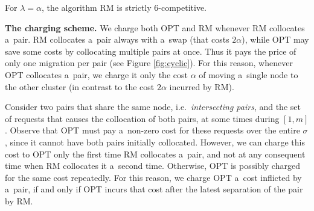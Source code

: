 \documentclass[a4paper,anonymous,USenglish]{lipics-v2019}
\newcommand{\OPT}{\textsc{OPT}\xspace}
\newcommand{\RM}{\textsc{RM}\xspace} %
\begin{document}
\begin{theorem} \label{thm:k=2}
	For $\lambda=\alpha$, the algorithm \RM  is strictly 6-competitive.
\end{theorem}

\noindent
\textbf{The charging scheme.}
We charge both \OPT and \RM whenever \RM collocates a~pair.%
\RM collocates a~pair always with a~swap %
(that costs $2\alpha$),
while \OPT may save some costs by collocating multiple pairs at once.
 Thus it pays the price of only one migration per pair  (see Figure \ref{fig:cyclic}).
For this reason, whenever \OPT collocates a~pair,
we charge it only the cost $\alpha$ of moving a~single node to the other cluster (in contrast to the cost $2\alpha$ incurred by \RM).

Consider two  pairs that share the same node, 
i.e.~\emph{intersecting pairs},
and the set of requests that causes the collocation of both pairs,
at some  times during  $[1,m]$.
Observe that \OPT must pay a~non-zero cost
for these requests over the entire $\sigma$,
since it cannot have both pairs initially collocated.
However,
we can charge this cost to \OPT only the first time \RM collocates a~pair,
and not at any consequent time when \RM collocates it a~second time.
Otherwise,
 \OPT is possibly charged for the same cost repeatedly.
For this reason,
we charge \OPT a~cost inflicted by a~pair,
if and only if  \OPT incurs that cost after the latest separation of the pair by \RM.
\end{document}
